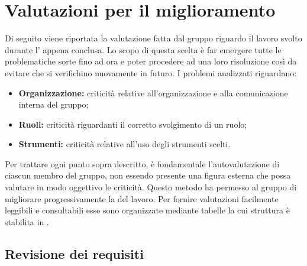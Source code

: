 \appendix
\section{Valutazioni per il miglioramento}
\label{miglioramento}
Di seguito viene riportata la valutazione fatta dal gruppo {\Gruppo} riguardo il lavoro svolto durante l' appena conclusa. Lo scopo di questa scelta è far emergere tutte le problematiche sorte fino ad ora e poter procedere ad una loro risoluzione  così da evitare che si verifichino nuovamente in futuro.
I problemi analizzati riguardano:
\begin{itemize}
	\item \textbf{Organizzazione:} criticità relative all'organizzazione e alla comunicazione interna del gruppo;
	\item \textbf{Ruoli:} criticità riguardanti il corretto svolgimento di un ruolo;
	\item \textbf{Strumenti:} criticità relative all'uso degli strumenti scelti.
\end{itemize}
Per trattare ogni punto sopra descritto, è fondamentale l'autovalutazione di ciascun membro del gruppo, non essendo presente una figura esterna che possa valutare in modo oggettivo le criticità. Questo metodo ha permesso al gruppo di migliorare progressivamente la  del lavoro. Per fornire valutazioni facilmente leggibili e consultabili esse sono organizzate mediante tabelle la cui struttura è stabilita in .
\subsection{Revisione dei requisiti}
